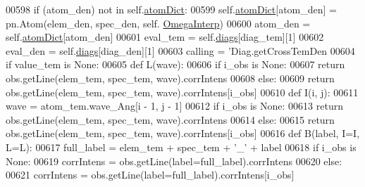 \begin{DoxyCode}
{{{00598         \textcolor{keywordflow}{if} (atom\_den) \textcolor{keywordflow}{not} \textcolor{keywordflow}{in} self.\hyperlink{classpyneb_1_1core_1_1diags_1_1_diagnostics_a36301f268745b33abe6cfeb3e41a6356}{atomDict}:
00599             self.\hyperlink{classpyneb_1_1core_1_1diags_1_1_diagnostics_a36301f268745b33abe6cfeb3e41a6356}{atomDict}[atom\_den] = pn.Atom(elem\_den, spec\_den, self.
      \hyperlink{classpyneb_1_1core_1_1diags_1_1_diagnostics_acfd0638b293790832bcee3cd9f3ec342}{OmegaInterp})
00600         atom\_den = self.\hyperlink{classpyneb_1_1core_1_1diags_1_1_diagnostics_a36301f268745b33abe6cfeb3e41a6356}{atomDict}[atom\_den]
00601         eval\_tem = self.\hyperlink{classpyneb_1_1core_1_1diags_1_1_diagnostics_a0c0f7e36097677f61a6a14a0c3127b02}{diags}[diag\_tem][1]
00602         eval\_den = self.\hyperlink{classpyneb_1_1core_1_1diags_1_1_diagnostics_a0c0f7e36097677f61a6a14a0c3127b02}{diags}[diag\_den][1]
00603         calling = \textcolor{stringliteral}{'Diag.getCrossTemDen %
00604         \textcolor{keywordflow}{if} value\_tem \textcolor{keywordflow}{is} \textcolor{keywordtype}{None}:
00605             \textcolor{keyword}{def }L(wave):
00606                 \textcolor{keywordflow}{if} i\_obs \textcolor{keywordflow}{is} \textcolor{keywordtype}{None}:
00607                     \textcolor{keywordflow}{return} obs.getLine(elem\_tem, spec\_tem, wave).corrIntens
00608                 \textcolor{keywordflow}{else}:
00609                     \textcolor{keywordflow}{return} obs.getLine(elem\_tem, spec\_tem, wave).corrIntens[i\_obs]
00610             \textcolor{keyword}{def }I(i, j):
00611                 wave = atom\_tem.wave\_Ang[i - 1, j - 1]
00612                 \textcolor{keywordflow}{if} i\_obs \textcolor{keywordflow}{is} \textcolor{keywordtype}{None}:
00613                     \textcolor{keywordflow}{return} obs.getLine(elem\_tem, spec\_tem, wave).corrIntens
00614                 \textcolor{keywordflow}{else}:
00615                     \textcolor{keywordflow}{return} obs.getLine(elem\_tem, spec\_tem, wave).corrIntens[i\_obs]
00616             \textcolor{keyword}{def }B(label, I=I, L=L):
00617                 full\_label = elem\_tem + spec\_tem + \textcolor{stringliteral}{'\_'} + label
00618                 \textcolor{keywordflow}{if} i\_obs \textcolor{keywordflow}{is} \textcolor{keywordtype}{None}:
00619                     corrIntens = obs.getLine(label=full\_label).corrIntens
00620                 \textcolor{keywordflow}{else}:
00621                     corrIntens = obs.getLine(label=full\_label).corrIntens[i\_obs]
}}}}
\end{DoxyCode}

